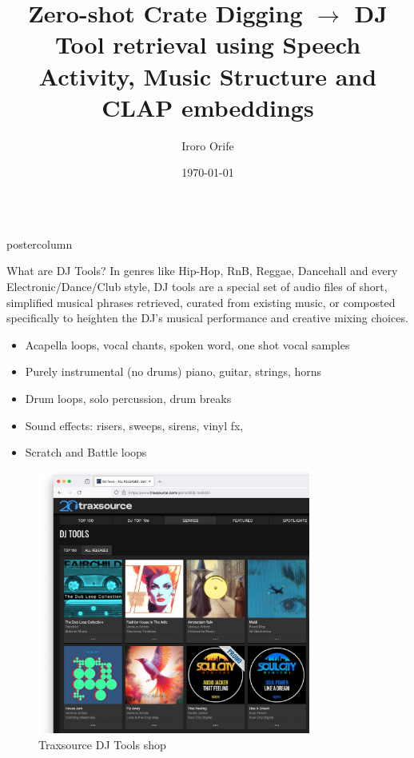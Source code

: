 \documentclass{beamer}
\title{\huge Zero-shot Crate Digging $\rightarrow$ DJ Tool retrieval using Speech Activity, Music Structure and CLAP embeddings}
\author{Iroro Orife}
\institute[ETH]{Independent}
\date{\today}
\newlength{\columnheight}
\begin{document}
\begin{frame}
\begin{columns}
	\begin{column}{.43\textwidth}
		\begin{beamercolorbox}[center]{postercolumn}
			\begin{minipage}{.98\textwidth}  %
				\parbox[t][\columnheight]{\textwidth}{ %
				
				
					\begin{myblock}{What are DJ Tools?}
					In genres like Hip-Hop, RnB, Reggae, Dancehall and every Electronic/Dance/Club style, DJ tools are a special set of audio files of short, simplified musical phrases retrieved, curated from existing music, or composted specifically to heighten the DJ's musical performance and creative mixing choices.
						
						\vspace{0.7em}

						\begin{itemize}
							\item Acapella loops, vocal chants, spoken word, one shot vocal samples
							\item Purely instrumental (no drums) piano, guitar, strings, horns 
							\item Drum loops, solo percussion, drum breaks
							\item Sound effects: risers, sweeps, sirens, vinyl fx, 
							\item Scratch and Battle loops

						\end{itemize}
						\vspace{0.7em}

						\begin{figure}
							\begin{minipage}{0.43\textwidth}
								\centering\includegraphics[width=0.8\textwidth]{img/traxsource_djtools.png}
								\caption{Traxsource DJ Tools shop}
							\end{minipage}
						\end{figure}



\end{myblock}}
\end{minipage}
\end{beamercolorbox}
\end{column}
\end{columns}
\end{frame}
\end{document}
